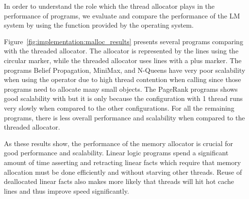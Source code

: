 In order to understand the role which the thread allocator plays in the
performance of programs, we evaluate and compare the performance of the LM
system by using the  function provided by the operating system.

Figure~\ref{fig:implementation:malloc_results} presents several programs
comparing  with the threaded allocator. The  allocator
is represented by the lines using the circular marker, while the threaded
allocator uses lines with a plus marker. The programs Belief Propagation,
MiniMax, and N-Queens have very poor scalability when using the 
operator due to high thread contention when calling  since
those programs need to allocate many small objects. The PageRank programs shows
good scalability with  but it is only because the configuration
with 1 thread runs very slowly when compared to the other configurations. For all
the remaining programs, there is less overall performance and scalability when
compared to the threaded allocator.

As these results show, the performance of the memory allocator is crucial for
good performance and scalability. Linear logic programs spend a significant
amount of time asserting and retracting linear facts which require that memory
allocation must be done efficiently and without starving other threads. Reuse of
deallocated linear facts also makes more likely that threads will hit hot cache
lines and thus improve speed significantly.

\newcommand{\smallplotsize}[0]{0.3}

